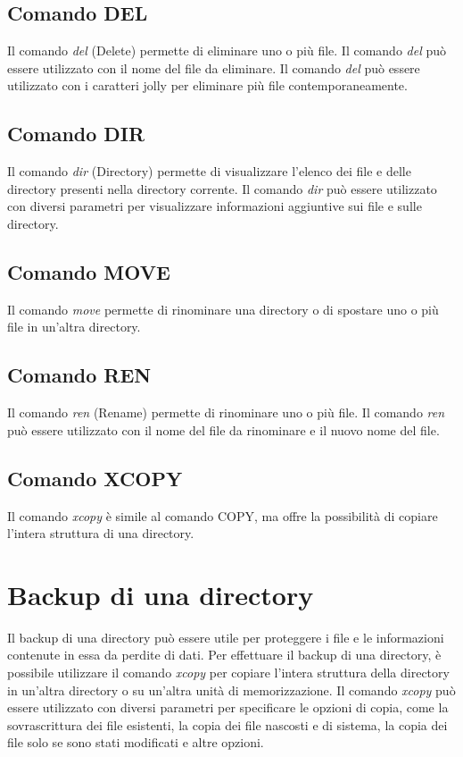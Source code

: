 \documentclass[12pt]{report}
\begin{document}
	\subsection{Comando DEL}
	Il comando \textit{del} (Delete) permette di eliminare uno o più file. Il comando \textit{del} può essere utilizzato con il nome del file da eliminare. Il comando \textit{del} può essere utilizzato con i caratteri jolly per eliminare più file contemporaneamente.

	\subsection{Comando DIR}
	Il comando \textit{dir} (Directory) permette di visualizzare l'elenco dei file e delle directory presenti nella directory corrente. Il comando \textit{dir} può essere utilizzato con diversi parametri per visualizzare informazioni aggiuntive sui file e sulle directory.

	\subsection{Comando MOVE}
	Il comando \textit{move} permette di rinominare una directory o di spostare uno o più file in un'altra directory.

	\subsection{Comando REN}
	Il comando \textit{ren} (Rename) permette di rinominare uno o più file. Il comando \textit{ren} può essere utilizzato con il nome del file da rinominare e il nuovo nome del file.

	\subsection{Comando XCOPY}
	Il comando \textit{xcopy} è simile al comando COPY, ma offre la possibilità di copiare l'intera struttura di una directory.

	\section{Backup di una directory}
	Il backup di una directory può essere utile per proteggere i file e le informazioni contenute in essa da perdite di dati. Per effettuare il backup di una directory, è possibile utilizzare il comando \textit{xcopy} per copiare l'intera struttura della directory in un'altra directory o su un'altra unità di memorizzazione. Il comando \textit{xcopy} può essere utilizzato con diversi parametri per specificare le opzioni di copia, come la sovrascrittura dei file esistenti, la copia dei file nascosti e di sistema, la copia dei file solo se sono stati modificati e altre opzioni.
\end{document}

